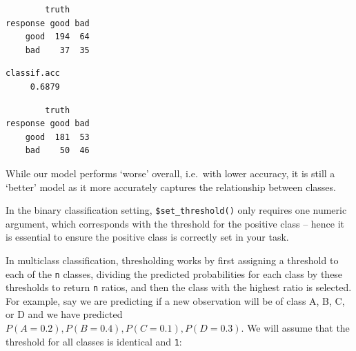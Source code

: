 \begin{verbatim}
        truth
response good bad
    good  194  64
    bad    37  35
\end{verbatim}

\begin{Shaded}
\begin{Highlighting}[]
\SpecialCharTok{$}\NormalTok{(}\NormalTok{)}
\SpecialCharTok{$}\NormalTok{(}\NormalTok{(}\NormalTok{))}
\end{Highlighting}
\end{Shaded}

\begin{verbatim}
classif.acc 
     0.6879 
\end{verbatim}

\begin{Shaded}
\begin{Highlighting}[]
\SpecialCharTok{$}
\end{Highlighting}
\end{Shaded}

\begin{verbatim}
        truth
response good bad
    good  181  53
    bad    50  46
\end{verbatim}

While our model performs `worse' overall, i.e.~with lower accuracy, it
is still a `better' model as it more accurately captures the
relationship between classes.

In the binary classification setting, \texttt{\$set\_threshold()} only
requires one numeric argument, which corresponds with the threshold for
the positive class -- hence it is essential to ensure the positive class
is correctly set in your task.

In multiclass classification, thresholding works by first assigning a
threshold to each of the \texttt{n} classes, dividing the predicted
probabilities for each class by these thresholds to return \texttt{n}
ratios, and then the class with the highest ratio is selected. For
example, say we are predicting if a new observation will be of class A,
B, C, or D and we have predicted
\(P(A = 0.2), P(B = 0.4), P(C = 0.1), P(D = 0.3)\). We will assume that
the threshold for all classes is identical and \texttt{1}:

\begin{Shaded}
\begin{Highlighting}[]
\OtherTok{=} \NormalTok{(}\NormalTok{, }\NormalTok{, }\NormalTok{, }\NormalTok{)}
\OtherTok{=} \NormalTok{(} \NormalTok{, } \NormalTok{, } \NormalTok{, } \NormalTok{)}
\SpecialCharTok{/}
\end{Highlighting}
\end{Shaded}


